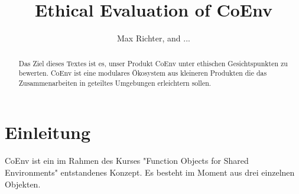 \documentclass{article}
\title{Ethical Evaluation of CoEnv}
\author{Max Richter, and ...}
\begin{document}
\maketitle

\begin{abstract}
  Das Ziel dieses Textes ist es, unser Produkt CoEnv unter ethischen Gesichtspunkten zu bewerten. CoEnv ist eine modulares Ökosystem aus kleineren Produkten die das Zusammenarbeiten in geteiltes Umgebungen erleichtern sollen.
\end{abstract}

\section{Einleitung}

CoEnv ist ein im Rahmen des Kurses "Function Objects for Shared Environments" entstandenes Konzept. Es besteht im Moment aus drei einzelnen Objekten.



\end{document}
